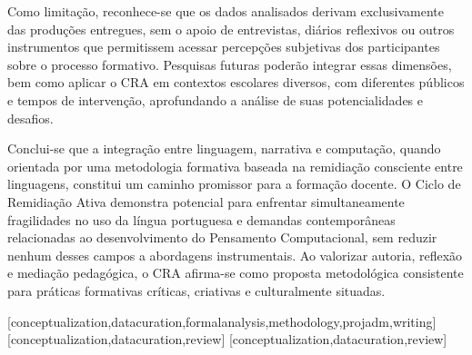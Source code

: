 \documentclass[portuguese]{textolivre}
\begin{document}
Como limitação, reconhece-se que os dados analisados derivam exclusivamente das produções entregues, sem o apoio de entrevistas, diários reflexivos ou outros instrumentos que permitissem acessar percepções subjetivas dos participantes sobre o processo formativo. Pesquisas futuras poderão integrar essas dimensões, bem como aplicar o CRA em contextos escolares diversos, com diferentes públicos e tempos de intervenção, aprofundando a análise de suas potencialidades e desafios.

Conclui-se que a integração entre linguagem, narrativa e computação, quando orientada por uma metodologia formativa baseada na remidiação consciente entre linguagens, constitui um caminho promissor para a formação docente. O Ciclo de Remidiação Ativa demonstra potencial para enfrentar simultaneamente fragilidades no uso da língua portuguesa e demandas contemporâneas relacionadas ao desenvolvimento do Pensamento Computacional, sem reduzir nenhum desses campos a abordagens instrumentais. Ao valorizar autoria, reflexão e mediação pedagógica, o CRA afirma-se como proposta metodológica consistente para práticas formativas críticas, criativas e culturalmente situadas.

\printbibliography\label{sec-bib}


\begin{contributors}
[conceptualization,datacuration,formalanalysis,methodology,projadm,writing]
[conceptualization,datacuration,review]
[conceptualization,datacuration,review]
\end{contributors}

\begin{dataavailability}
\end{dataavailability}
\end{document}
